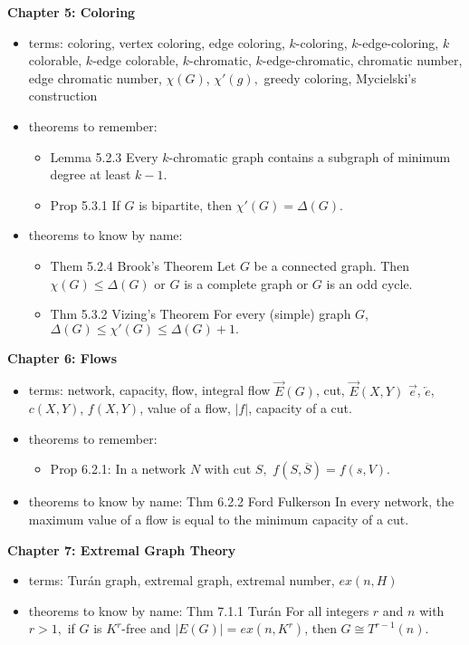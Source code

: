 \documentclass[12pt]{article}
\newcommand{\ora}[1]{\overrightarrow{#1}}
\newcommand{\ola}[1]{\overleftarrow{#1}}
\newcommand{\ovl}[1]{\overline{#1}}
\begin{document}
\noindent \textbf{Chapter 5: Coloring}
\begin{itemize}
	\item terms: coloring, vertex coloring, edge coloring, $k$-coloring, $k$-edge-coloring, $k$ colorable, $k$-edge colorable, $k$-chromatic, $k$-edge-chromatic, chromatic number, edge chromatic number, $\chi(G)$, $\chi'(g),$ greedy coloring, Mycielski's construction
	\item theorems to remember: 
	\begin{itemize}
		\item Lemma 5.2.3 Every $k$-chromatic graph contains a subgraph of minimum degree at least $k-1.$
		\item Prop 5.3.1 If $G$ is bipartite, then $\chi'(G)=\Delta(G).$
	\end{itemize}  
	\item theorems to know by name: 
	\begin{itemize}
		\item Them 5.2.4 Brook's Theorem Let $G$ be a connected graph. Then $\chi(G) \leq \Delta(G)$ or $G$ is a complete graph or $G$ is an odd cycle.
		\item Thm 5.3.2 Vizing's Theorem For every (simple) graph $G$, $\Delta(G) \leq \chi'(G) \leq \Delta(G)+1.$
	\end{itemize}
\end{itemize}

\noindent \textbf{Chapter 6: Flows}
\begin{itemize}
	\item terms: network, capacity, flow, integral flow $\ora{E}(G)$, cut, $\ora{E}(X,Y)$ $\ora{e}$, $\ola{e}$, $c(X,Y)$, $f(X,Y)$, value of a flow, $|f|$, capacity of a cut.
	\item theorems to remember: 
	\begin{itemize}
		\item Prop 6.2.1: In a network $N$ with cut $S,$ $f(S,\ovl{S})=f(s,V).$
	\end{itemize}  
	\item theorems to know by name: Thm 6.2.2 Ford Fulkerson In every network, the maximum value of a flow is equal to the minimum capacity of a cut.
\end{itemize}

\noindent \textbf{Chapter 7: Extremal Graph Theory}
\begin{itemize}
	\item terms: Tur\'{a}n graph, extremal graph, extremal number, $ex(n,H)$
	\item theorems to know by name: Thm 7.1.1 Tur\'{a}n For all integers $r$ and $n$ with $r >1,$ if $G$ is $K^r$-free and $|E(G)|=ex(n,K^r)$, then $G \cong T^{r-1}(n).$
\end{itemize}
\end{document}
